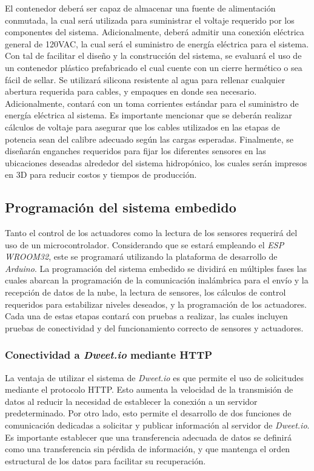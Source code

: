 El contenedor deberá ser capaz de almacenar una fuente de alimentación conmutada, la cual será utilizada para suministrar el voltaje requerido por los componentes del sistema. Adicionalmente, deberá admitir una conexión eléctrica general de 120VAC, la cual será el suministro de energía eléctrica para el sistema. Con tal de facilitar el diseño y la construcción del sistema, se evaluará el uso de un contenedor plástico prefabricado el cual cuente con un cierre hermético o sea fácil de sellar. Se utilizará silicona resistente al agua para rellenar cualquier abertura requerida para cables, y empaques en donde sea necesario. Adicionalmente, contará con un toma corrientes estándar para el suministro de energía eléctrica al sistema. Es importante mencionar que se deberán realizar cálculos de voltaje para asegurar que los cables utilizados en las etapas de potencia sean del calibre adecuado según las cargas esperadas. Finalmente, se diseñarán enganches requeridos para fijar los diferentes sensores en las ubicaciones deseadas alrededor del sistema hidropónico, los cuales serán impresos en 3D para reducir costos y tiempos de producción.

\subsection*{Programación del sistema embedido}
Tanto el control de los actuadores como la lectura de los sensores requerirá del uso de un microcontrolador. Considerando que se estará empleando el \textit{ESP WROOM32}, este se programará utilizando la plataforma de desarrollo de \textit{Arduino}. La programación del sistema embedido se dividirá en múltiples fases las cuales abarcan la programación de la comunicación inalámbrica para el envío y la recepción de datos de la nube, la lectura de sensores, los cálculos de control requeridos para estabilizar niveles deseados, y la programación de los actuadores. Cada una de estas etapas contará con pruebas a realizar, las cuales incluyen pruebas de conectividad y del funcionamiento correcto de sensores y actuadores.

\subsubsection{Conectividad a \textit{Dweet.io} mediante HTTP}
La ventaja de utilizar el sistema de \textit{Dweet.io} es que permite el uso de solicitudes mediante el protocolo HTTP. Esto aumenta la velocidad de la transmisión de datos al reducir la necesidad de establecer la conexión a un servidor predeterminado. Por otro lado, esto permite el desarrollo de dos funciones de comunicación dedicadas a solicitar y publicar información al servidor de \textit{Dweet.io}. Es importante establecer que una transferencia adecuada de datos se definirá como una transferencia sin pérdida de información, y que mantenga el orden estructural de los datos para facilitar su recuperación. 

